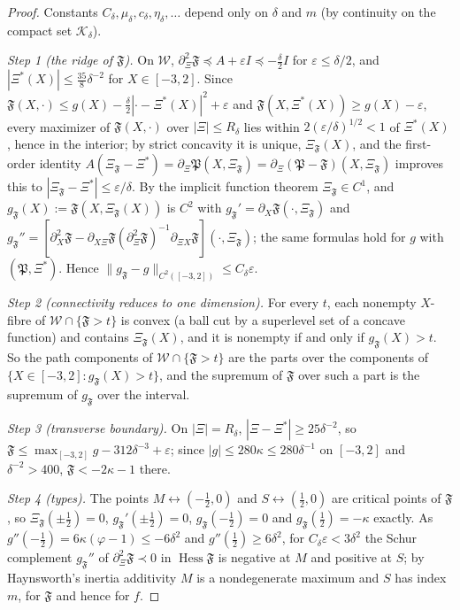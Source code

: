 \begin{proof}
Constants $C_\delta,\mu_\delta,c_\delta,\eta_\delta,\dots$ depend only on $\delta$ and $m$ (by continuity on the compact set $\mathcal K_\delta$).

\emph{Step 1 (the ridge of $\mathfrak F$).} On $\mathcal W$, $\partial_\Xi^2\mathfrak F\preceq A+\varepsilon I\preceq-\frac\delta2I$ for $\varepsilon\le\delta/2$, and $|\Xi^*(X)|\le\frac{35}8\delta^{-2}$ for $X\in[-3,2]$. Since $\mathfrak F(X,\cdot)\le g(X)-\frac\delta2|\cdot-\Xi^*(X)|^2+\varepsilon$ and $\mathfrak F(X,\Xi^*(X))\ge g(X)-\varepsilon$, every maximizer of $\mathfrak F(X,\cdot)$ over $|\Xi|\le R_\delta$ lies within $2(\varepsilon/\delta)^{1/2}<1$ of $\Xi^*(X)$, hence in the interior; by strict concavity it is unique, $\Xi_{\mathfrak F}(X)$, and the first-order identity $A(\Xi_{\mathfrak F}-\Xi^*)=\partial_\Xi\mathfrak P(X,\Xi_{\mathfrak F})=\partial_\Xi(\mathfrak P-\mathfrak F)(X,\Xi_{\mathfrak F})$ improves this to $|\Xi_{\mathfrak F}-\Xi^*|\le\varepsilon/\delta$. By the implicit function theorem $\Xi_{\mathfrak F}\in C^1$, and $g_{\mathfrak F}(X):=\mathfrak F(X,\Xi_{\mathfrak F}(X))$ is $C^2$ with $g_{\mathfrak F}'=\partial_X\mathfrak F(\cdot,\Xi_{\mathfrak F})$ and $g_{\mathfrak F}''=[\partial_X^2\mathfrak F-\partial_{X\Xi}\mathfrak F(\partial_\Xi^2\mathfrak F)^{-1}\partial_{\Xi X}\mathfrak F](\cdot,\Xi_{\mathfrak F})$; the same formulas hold for $g$ with $(\mathfrak P,\Xi^*)$. Hence $\|g_{\mathfrak F}-g\|_{C^2([-3,2])}\le C_\delta\varepsilon$.

\emph{Step 2 (connectivity reduces to one dimension).} For every $t$, each nonempty $X$-fibre of $\mathcal W\cap\{\mathfrak F>t\}$ is convex (a ball cut by a superlevel set of a concave function) and contains $\Xi_{\mathfrak F}(X)$, and it is nonempty if and only if $g_{\mathfrak F}(X)>t$. So the path components of $\mathcal W\cap\{\mathfrak F>t\}$ are the parts over the components of $\{X\in[-3,2]:g_{\mathfrak F}(X)>t\}$, and the supremum of $\mathfrak F$ over such a part is the supremum of $g_{\mathfrak F}$ over the interval.

\emph{Step 3 (transverse boundary).} On $|\Xi|=R_\delta$, $|\Xi-\Xi^*|\ge25\delta^{-2}$, so $\mathfrak F\le\max_{[-3,2]}g-312\delta^{-3}+\varepsilon$; since $|g|\le280\kappa\le280\delta^{-1}$ on $[-3,2]$ and $\delta^{-2}>400$, $\mathfrak F<-2\kappa-1$ there.

\emph{Step 4 (types).} The points $M\leftrightarrow(-\frac12,0)$ and $S\leftrightarrow(\frac12,0)$ are critical points of $\mathfrak F$, so $\Xi_{\mathfrak F}(\pm\frac12)=0$, $g_{\mathfrak F}'(\pm\frac12)=0$, $g_{\mathfrak F}(-\frac12)=0$ and $g_{\mathfrak F}(\frac12)=-\kappa$ exactly. As $g''(-\frac12)=6\kappa(\varphi-1)\le-6\delta^2$ and $g''(\frac12)\ge6\delta^2$, for $C_\delta\varepsilon<3\delta^2$ the Schur complement $g_{\mathfrak F}''$ of $\partial_\Xi^2\mathfrak F\prec0$ in $\operatorname{Hess}\mathfrak F$ is negative at $M$ and positive at $S$; by Haynsworth's inertia additivity $M$ is a nondegenerate maximum and $S$ has index $m$, for $\mathfrak F$ and hence for $f$.


\end{proof}
